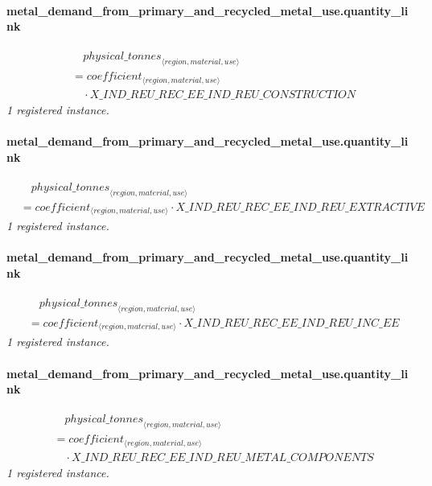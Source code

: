 \documentclass[11pt]{article}
\begin{document}
\paragraph{metal\_demand\_from\_primary\_and\_recycled\_metal\_use.quantity\_link}
\begin{align*}
&\quad {physical\_tonnes}_{\langle region, material, use\rangle}\\
&= coefficient_{\langle region, material, use\rangle}\\
&\quad {}\cdot X\_IND\_REU\_REC\_EE\_IND\_REU\_CONSTRUCTION
\end{align*}
\noindent\emph{1 registered instance.}\par
\paragraph{metal\_demand\_from\_primary\_and\_recycled\_metal\_use.quantity\_link}
\begin{align*}
&\quad {physical\_tonnes}_{\langle region, material, use\rangle}\\
&= coefficient_{\langle region, material, use\rangle} \cdot X\_IND\_REU\_REC\_EE\_IND\_REU\_EXTRACTIVE
\end{align*}
\noindent\emph{1 registered instance.}\par
\paragraph{metal\_demand\_from\_primary\_and\_recycled\_metal\_use.quantity\_link}
\begin{align*}
&\quad {physical\_tonnes}_{\langle region, material, use\rangle}\\
&= coefficient_{\langle region, material, use\rangle} \cdot X\_IND\_REU\_REC\_EE\_IND\_REU\_INC\_EE
\end{align*}
\noindent\emph{1 registered instance.}\par
\paragraph{metal\_demand\_from\_primary\_and\_recycled\_metal\_use.quantity\_link}
\begin{align*}
&\quad {physical\_tonnes}_{\langle region, material, use\rangle}\\
&= coefficient_{\langle region, material, use\rangle}\\
&\quad {}\cdot X\_IND\_REU\_REC\_EE\_IND\_REU\_METAL\_COMPONENTS
\end{align*}
\noindent\emph{1 registered instance.}\par
\end{document}
